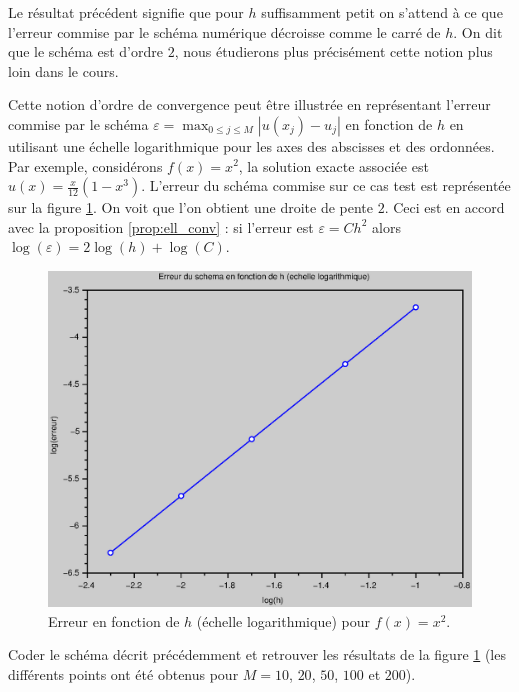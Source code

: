 \documentclass[12pt,a4paper,twoside]{article}
\begin{document}
Le r\'esultat pr\'ec\'edent signifie que pour $h$ suffisamment petit
on s'attend \`a ce que l'erreur commise par le sch\'ema num\'erique d\'ecroisse
comme le carr\'e de $h$.
On dit que le sch\'ema est d'ordre $2$, nous \'etudierons plus pr\'ecis\'ement cette notion
plus loin dans le cours.


Cette notion d'ordre de convergence peut \^etre illustr\'ee en repr\'esentant 
l'erreur commise par le sch\'ema 
$\varepsilon = \max_{0\leq j \leq M} |u(x_j) - u_j|$ en fonction de $h$ 
en utilisant une \'echelle logarithmique
pour les axes des abscisses et des ordonn\'ees.
Par exemple, consid\'erons $f(x) = x^2$, la solution exacte associ\'ee
est $u(x) = \frac{x}{12}(1-x^3)$.
L'erreur du sch\'ema commise sur ce cas test est repr\'esent\'ee
sur la figure \ref{fig:ell_convergence}.
On voit que l'on obtient une droite de pente $2$.
Ceci est en accord avec la proposition \ref{prop:ell_conv} :
si l'erreur est $\varepsilon = C h^2$ alors
$\log(\varepsilon) = 2 \log(h) + \log(C)$.

\begin{figure}[h]
  \centering
  \includegraphics[width = 12cm]{Figures/Poisson_conv.eps}
  \caption{Erreur en fonction de $h$ (\'echelle logarithmique)
    pour $f(x) = x^2$.}
  \label{fig:ell_convergence}
\end{figure}


\begin{exercise}
  Coder le sch\'ema d\'ecrit pr\'ec\'edemment et retrouver les 
  r\'esultats de la figure \ref{fig:ell_convergence}
  (les diff\'erents points ont \'et\'e obtenus pour $M=10$, $20$,
  $50$, $100$ et $200$).
\end{exercise}
\end{document}
